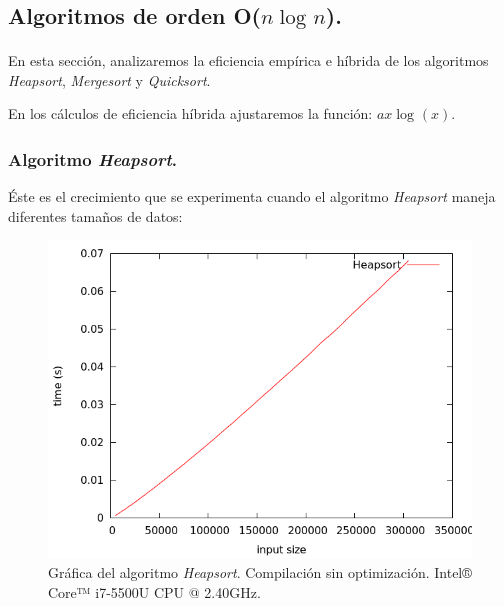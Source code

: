 \documentclass[11pt,a4paper]{article}
\begin{document}
\begin{figure}[h]
\begin{tabular}{| >{\centering\arraybackslash}m{1in} | >{\centering\arraybackslash}m{1in} | >{\centering\arraybackslash}m{1in} | >{\centering\arraybackslash}m{1in} |}
					\end{tabular}

				\end{figure}

\newpage

		\subsection{Algoritmos de orden O($n\log_{}n$).}

			\par
			En esta sección, analizaremos la eficiencia empírica e híbrida de los algoritmos \textit{Heapsort}, \textit{Mergesort} y \textit{Quicksort}.

			\par
			En los cálculos de eficiencia híbrida ajustaremos la función: $ax \log_{}(x)$.

			\subsubsection{Algoritmo \textit{Heapsort}.}

				\par
				Éste es el crecimiento que se experimenta cuando el algoritmo \textit{Heapsort} maneja diferentes tamaños de datos:

				\begin{figure}[h]

					\centering
					\includegraphics[width=1\textwidth]{heapsort.png}
					\caption{Gráfica del algoritmo \textit{Heapsort}. Compilación sin optimización. Intel® Core™ i7-5500U CPU @ 2.40GHz.}

				\end{figure}
\end{document}
